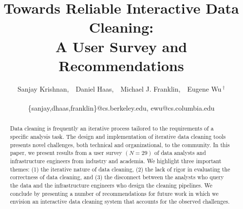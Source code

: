 \documentclass{sig-alternate-05-2015}
\author{\large Sanjay Krishnan,~~Daniel Haas,~~Michael J. Franklin,~~Eugene Wu{$\,^\dag$} \\
\vspace{.2em}\affaddr{\large AMPLab, UC Berkeley ~~~~ $^\dag$Columbia University} \\
\fontsize{9}{10}\selectfont\ttfamily\upshape
\vspace{.1em}\{sanjay,dhaas,franklin\}@cs.berkeley.edu, ewu@cs.columbia.edu
}
\begin{document}
\newtheorem{theorem}{Theorem}
\newtheorem{example}{Example}
\newtheorem{definition}{Definition}
\newtheorem{problem}{Problem}
\newtheorem{property}{Property}
\newtheorem{proposition}{Proposition}
\newtheorem{lemma}{Lemma}
\newtheorem{corollary}{Corollary}



\title{Towards Reliable Interactive Data Cleaning: \\ A User Survey and Recommendations}


\maketitle

\begin{abstract}
Data cleaning is frequently an iterative process tailored to the requirements of a specific analysis task.
The design and implementation of iterative data cleaning tools presents novel challenges, both technical and organizational, to the community.
In this paper, we present results from a user survey $(N=29)$ of data analysts and infrastructure engineers from industry and academia. We highlight three important themes: (1) the iterative nature of data cleaning, (2) the lack of rigor in evaluating the correctness of data cleaning, and (3) the disconnect between the analysts who query the data and the infrastructure engineers who design the cleaning pipelines.
We conclude by presenting a number of recommendations for future work in which we envision an interactive data cleaning system that accounts for the observed challenges.
\end{abstract}








 
\clearpage
\normalsize \selectfont
\end{document}

